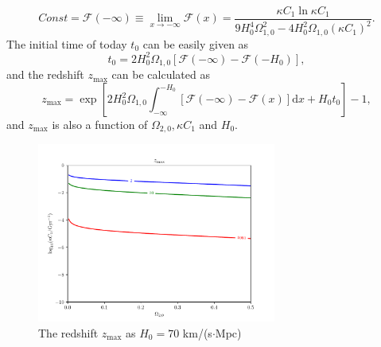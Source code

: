 \documentclass[twocolumn]{aastex631}
\begin{document}
   \begin{equation}
      Const=\mathcal{F}(-\infty)\equiv\lim_{x\to-\infty}\mathcal{F}(x)=
      \frac{\kappa C_1\ln\kappa C_1}{9H_0^4\Omega_{1,0}^2-4H_0^2\Omega_{1,0}(\kappa C_1)^2}.
   \end{equation}
   The initial time of today $t_0$ can be easily given as
   \begin{equation}
      t_0=2H_0^2\Omega_{1,0}[\mathcal{F}(-\infty)-\mathcal{F}(-H_0)],
   \end{equation}
   and the redshift $z_{\max}$ can be calculated as
   \begin{equation}
      z_{\max}=\exp\left[2H_0^2\Omega_{1,0}\int_{-\infty}^{-H_0}[\mathcal{F}(-\infty)
      -\mathcal{F}(x)]\mathrm{d}x+H_0t_0\right]-1,
   \end{equation}
   and $z_{\max}$ is also a function of $\Omega_{2,0}, \kappa C_1$ and $H_0$.
   \begin{figure}
      \centering
      \includegraphics[width=0.7\textwidth]{zmax.pdf}
      \caption{The redshift $z_{\max}$ as $H_0=70$ km/(s$\cdot$Mpc)}
      \label{fig:3}
   \end{figure}



\end{document}
